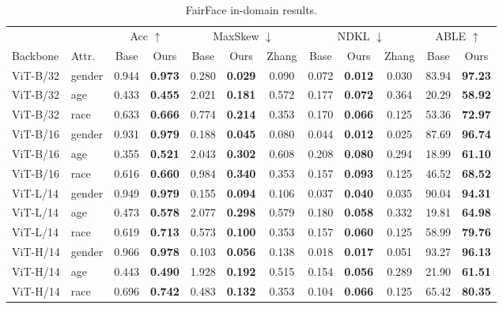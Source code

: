 \begin{table}[t]\centering\small
\caption{FairFace in-domain results.}
\label{tab:fairface}
\begin{tabular}{llcccccccccc}\toprule
& & \multicolumn{2}{c}{Acc $\uparrow$} & \multicolumn{3}{c}{MaxSkew $\downarrow$} & \multicolumn{3}{c}{NDKL $\downarrow$} & \multicolumn{2}{c}{ABLE $\uparrow$}\\
Backbone & Attr. & Base & Ours & Base & Ours & Zhang & Base & Ours & Zhang & Base & Ours\\\midrule
ViT-B/32 & gender & 0.944 & \textbf{0.973} & 0.280 & \textbf{0.029} & 0.090 & 0.072 & \textbf{0.012} & 0.030 & 83.94 & \textbf{97.23}\\
ViT-B/32 & age & 0.433 & \textbf{0.455} & 2.021 & \textbf{0.181} & 0.572 & 0.177 & \textbf{0.072} & 0.364 & 20.29 & \textbf{58.92}\\
ViT-B/32 & race & 0.633 & \textbf{0.666} & 0.774 & \textbf{0.214} & 0.353 & 0.170 & \textbf{0.066} & 0.125 & 53.36 & \textbf{72.97}\\
ViT-B/16 & gender & 0.931 & \textbf{0.979} & 0.188 & \textbf{0.045} & 0.080 & 0.044 & \textbf{0.012} & 0.025 & 87.69 & \textbf{96.74}\\
ViT-B/16 & age & 0.355 & \textbf{0.521} & 2.043 & \textbf{0.302} & 0.608 & 0.208 & \textbf{0.080} & 0.294 & 18.99 & \textbf{61.10}\\
ViT-B/16 & race & 0.616 & \textbf{0.660} & 0.984 & \textbf{0.340} & 0.353 & 0.157 & \textbf{0.093} & 0.125 & 46.52 & \textbf{68.52}\\
ViT-L/14 & gender & 0.949 & \textbf{0.979} & 0.155 & \textbf{0.094} & 0.106 & 0.037 & \textbf{0.040} & 0.035 & 90.04 & \textbf{94.31}\\
ViT-L/14 & age & 0.473 & \textbf{0.578} & 2.077 & \textbf{0.298} & 0.579 & 0.180 & \textbf{0.058} & 0.332 & 19.81 & \textbf{64.98}\\
ViT-L/14 & race & 0.619 & \textbf{0.713} & 0.573 & \textbf{0.100} & 0.353 & 0.157 & \textbf{0.060} & 0.125 & 58.99 & \textbf{79.76}\\
ViT-H/14 & gender & 0.966 & \textbf{0.978} & 0.103 & \textbf{0.056} & 0.138 & 0.018 & \textbf{0.017} & 0.051 & 93.27 & \textbf{96.13}\\
ViT-H/14 & age & 0.443 & \textbf{0.490} & 1.928 & \textbf{0.192} & 0.515 & 0.154 & \textbf{0.056} & 0.289 & 21.90 & \textbf{61.51}\\
ViT-H/14 & race & 0.696 & \textbf{0.742} & 0.483 & \textbf{0.132} & 0.353 & 0.104 & \textbf{0.066} & 0.125 & 65.42 & \textbf{80.35}\\
\bottomrule\end{tabular}\end{table}